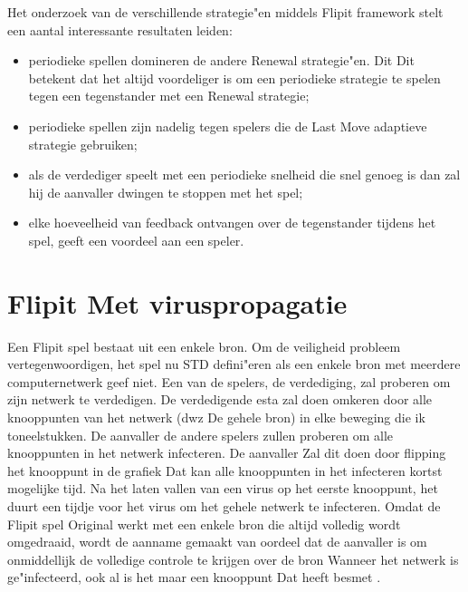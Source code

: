 \documentclass[master=cws, masteroption=vs]{kulemt}
\begin{document}
\begin{abstract*}
Het onderzoek van de verschillende strategie"en middels Flipit framework stelt een aantal interessante resultaten leiden:
\begin{itemize}
\item periodieke spellen domineren de andere Renewal strategie"en. Dit Dit betekent dat het altijd voordeliger is om een periodieke strategie te spelen tegen een tegenstander met een Renewal strategie;
\item periodieke spellen zijn nadelig tegen spelers die de Last Move adaptieve strategie gebruiken;
\item als de verdediger speelt met een periodieke snelheid die snel genoeg is dan zal hij de aanvaller dwingen te stoppen met het spel;
\item elke hoeveelheid van feedback ontvangen over de tegenstander tijdens het spel, geeft een voordeel aan een speler.
\end{itemize}


\section {Flipit Met viruspropagatie}
\label{ch: flipitvirus}
Een Flipit spel bestaat uit een enkele bron. Om de veiligheid probleem vertegenwoordigen, het spel nu STD defini"eren als een enkele bron met meerdere computernetwerk
geef niet. Een van de spelers, de verdediging, zal proberen om zijn netwerk te verdedigen. De verdedigende
esta zal doen omkeren door alle knooppunten van het netwerk (dwz De gehele bron) in elke beweging die ik toneelstukken. De
aanvaller de andere spelers zullen proberen om alle knooppunten in het netwerk infecteren. De aanvaller
Zal dit doen door flipping het knooppunt in de grafiek Dat kan alle knooppunten in het infecteren
kortst mogelijke tijd. Na het laten vallen van een virus op het eerste knooppunt, het duurt een tijdje voor het virus om het gehele netwerk te infecteren. Omdat de Flipit spel Original werkt met een enkele bron die altijd volledig wordt omgedraaid, wordt de aanname gemaakt van oordeel dat de aanvaller is om onmiddellijk de volledige controle te krijgen over de bron Wanneer het netwerk is ge"infecteerd, ook al is het maar een knooppunt Dat heeft besmet . \\


\end{abstract*}
\end{document}
